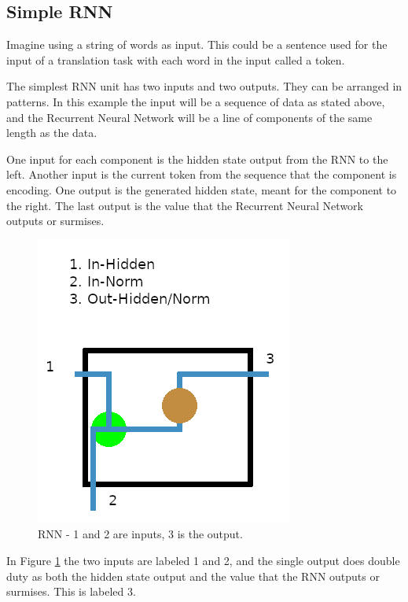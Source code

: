 \subsection{Simple RNN}

Imagine using a string of words as input. This could be a sentence used for the input of a translation task with each word in the input called a token.

The simplest RNN unit has two inputs and two outputs. They can be arranged in patterns. In this example the input will be a sequence of data as stated above, and the Recurrent Neural Network will be a line of components of the same length as the data.

One input for each component is the hidden state output from the RNN to the left. Another input is the current token from the sequence that the component is encoding. One output is the generated hidden state, meant for the component to the right. The last output is the value that the Recurrent Neural Network outputs or surmises. 

\begin{figure}[H]
	\begin{center}
	
	\includegraphics[scale=0.5]{diagram-rnn01}
		
	\end{center}
	\caption[Recurrent Neural Network]{RNN - 1 and 2 are inputs, 3 is the output.}
	\label{rnn-01}

\end{figure}

In Figure \ref{rnn-01} the two inputs are labeled 1 and 2, and the single output does double duty as both the hidden state output and the value that the RNN outputs or surmises. This is labeled 3.

